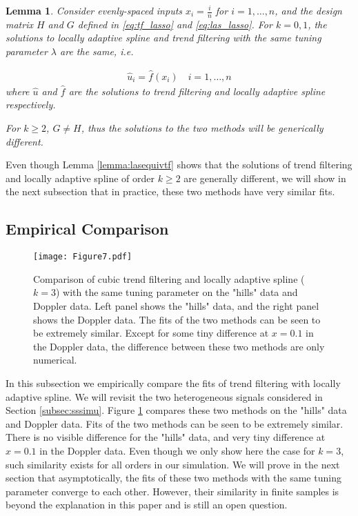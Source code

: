 \documentclass[a4paper]{article}
\newtheorem{lemma}[theorem]{Lemma}
\begin{document}
\begin{lemma}
Consider evenly-spaced inputs $x_i = \frac{i}{n}$ for $i= 1,\ldots, n$, and the design matrix $H$ and $G$ defined in \eqref{eq:tf_lasso} and \eqref{eq:las_lasso}. For $k = 0, 1$, the solutions to locally adaptive spline and trend filtering with the same tuning parameter $\lambda$ are the same, i.e.

\begin{align*}
\hat{u}_i = \hat{f}(x_i) \quad i=1,\ldots, n
\end{align*}
where $\hat{u}$ and $\hat{f}$ are the solutions to trend filtering and locally adaptive spline respectively.

For $k\geq 2$, $G\neq H$, thus the solutions to the two methods will be generically different. 
\label{lemma:lasequivtf}
\end{lemma}

Even though Lemma \eqref{lemma:lasequivtf} shows that the solutions of trend filtering and locally adaptive spline of order $k\geq 2$ are generally different, we will show in the next subsection that in practice, these two methods have very similar fits. 

\subsection{Empirical Comparison}
\label{subsec:emplasvstf}

\begin{figure}[t!]
\centering
\texttt{[image: Figure7.pdf]}
\caption{Comparison of cubic trend filtering and locally adaptive spline ($k = 3$) with the same tuning parameter on the "hills" data and Doppler data. Left panel shows the "hills" data, and the right panel shows the Doppler data. The fits of the two methods can be seen to be extremely similar. Except for some tiny difference at $x= 0.1$ in the Doppler data, the difference between these two methods are only numerical.}
\label{fig:Figure7_lasvstf}
\end{figure}

In this subsection we empirically compare the fits of trend filtering with locally adaptive spline. We will revisit the two heterogeneous signals considered in Section \eqref{subsec:sssimu}. Figure \ref{fig:Figure7_lasvstf} compares these two methods on the "hills" data and Doppler data. Fits of the two methods can be seen to be extremely similar. There is no visible difference for the "hills" data, and very tiny difference at $x = 0.1$ in the Doppler data. Even though we only show here the case for $k = 3$, such similarity exists for all orders in our simulation. We will prove in the next section that asymptotically, the fits of these two methods with the same tuning parameter converge to each other. However, their similarity in finite samples is beyond the explanation in this paper and is still an open question.
\end{document}
